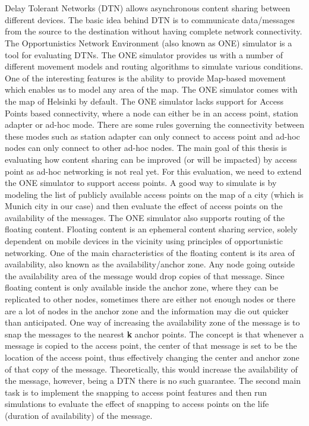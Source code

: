 \chapter{\abstractname}

Delay Tolerant Networks (DTN) allows asynchronous content sharing between different devices. The basic idea behind DTN is to communicate data/messages from the source to the destination without having complete network connectivity. The Opportunistics Network Environment (also known as ONE) simulator is a tool for evaluating DTNs. The ONE simulator provides us with a number of different movement models and routing algorithms to simulate various conditions. One of the interesting features is the ability to provide Map-based movement which enables us to model any area of the map. The ONE simulator comes with the map of Helsinki by default.
The ONE simulator lacks support for Access Points based connectivity, where a node can either be in an access point, station adapter or ad-hoc mode. There are some rules governing the connectivity between these modes such as station adapter can only connect to access point and ad-hoc nodes can only connect to other ad-hoc nodes. The main goal of this thesis is evaluating how content sharing can be improved (or will be impacted) by access point as ad-hoc networking is not real yet. For this evaluation, we need to extend the ONE simulator to support access points. A good way to simulate is by modeling the list of publicly available access points on the map of a city (which is Munich city in our case) and then evaluate the effect of access points on the availability of the messages.
The ONE simulator also supports routing of the floating content. Floating content is an ephemeral content sharing service, solely dependent on mobile devices in the vicinity using principles of opportunistic networking. One of the main characteristics of the floating content is its area of availability, also known as the availability/anchor zone. Any node going outside the availability area of the message would drop copies of that message.
Since floating content is only available inside the anchor zone, where they can be replicated to other nodes, sometimes there are either not enough nodes or there are a lot of nodes in the anchor zone and the information may die out quicker than anticipated. One way of increasing the availability zone of the message is to snap the messages to the nearest \textbf{k} anchor points. The concept is that whenever a message is copied to the access point, the center of that message is set to be the location of the access point, thus effectively changing the center and anchor zone of that copy of the message. Theoretically, this would increase the availability of the message, however, being a DTN there is no such guarantee. The second main task is to implement the snapping to access point features and then run simulations to evaluate the effect of snapping to access points on the life (duration of availability) of the message.
